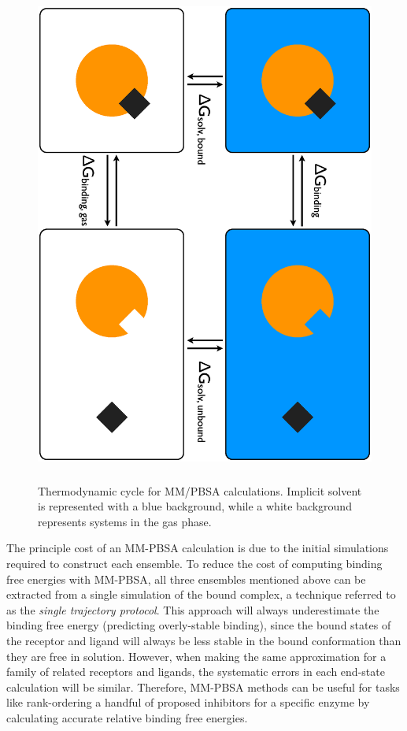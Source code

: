 \begin{figure}
   \includegraphics[height=6.5in, angle=90]{MMPBSA.ps}
   \caption{Thermodynamic cycle for MM/PBSA calculations. Implicit solvent is
            represented with a blue background, while a white background
            represents systems in the gas phase.}
   \label{fig2:MMPBSA}
\end{figure}

The principle cost of an MM-PBSA calculation is due to the initial simulations
required to construct each ensemble. To reduce the cost of computing binding
free energies with MM-PBSA, all three ensembles mentioned above can be extracted
from a single simulation of the bound complex, a technique referred to as the
\emph{single trajectory protocol}. \cite{MMPBSApy} This approach will always
underestimate the binding free energy (predicting overly-stable binding), since
the bound states of the receptor and ligand will always be less stable in the
bound conformation than they are free in solution. However, when making the same
approximation for a family of related receptors and ligands, the systematic
errors in each end-state calculation will be similar. Therefore, MM-PBSA methods
can be useful for tasks like rank-ordering a handful of proposed inhibitors for
a specific enzyme by calculating accurate relative binding free energies.
\cite{Homeyer2012}

